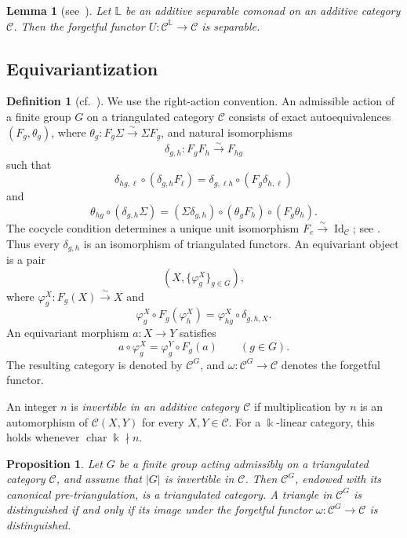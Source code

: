 \documentclass[a4paper,11pt,reqno]{amsart}
\newtheorem{proposition}[proposition]{Proposition}
\newtheorem{lemma}[lemma]{Lemma}
\theoremstyle{definition}
\newtheorem{definition}[definition]{Definition}
\theoremstyle{plain}
\numberwithin{equation}{section}
\newcommand{\C}{\mathcal C}
\newcommand{\kk}{\Bbbk}
\begin{document}
\begin{lemma}[{\normalfont see~\cite[Remark~5.19]{Balmer2011}}]
\label{lem:separable-comonad-forgetful}
Let \(\mathbb L\) be an additive separable comonad on an additive category
\(\C\).
Then the forgetful functor \(U:\C^{\mathbb L}\to\C\) is separable.
\end{lemma}

\subsection{Equivariantization}

\begin{definition}[{\normalfont cf.~\cite[Definitions~2.5 and~3.1]
{Sun2019}}]
We use the right-action convention.  An admissible action of a
finite group \(G\) on a triangulated category \(\C\) consists of exact
autoequivalences \((F_g,\theta_g)\), where
\(\theta_g:F_g\Sigma\xrightarrow{\sim}\Sigma F_g\), and natural isomorphisms
\[
 \delta_{g,h}:F_gF_h\xrightarrow{\sim}F_{hg}
\]
such that
\[
 \delta_{hg,\ell}\circ(\delta_{g,h}F_\ell)
 =\delta_{g,\ell h}\circ(F_g\delta_{h,\ell})
\]
and
\[
 \theta_{hg}\circ(\delta_{g,h}\Sigma)
 =(\Sigma\delta_{g,h})\circ(\theta_gF_h)\circ(F_g\theta_h).
\]
The cocycle condition determines a unique unit isomorphism
\(F_e\xrightarrow{\sim}\operatorname{Id}_{\C}\); see
\cite[Remark~2.7]{Sun2019}.  Thus every \(\delta_{g,h}\) is an isomorphism of triangulated functors.  An equivariant object is a
pair
\[
 (X,\{\varphi_g^X\}_{g\in G}),
\]
where \(\varphi_g^X:F_g(X)\xrightarrow{\sim}X\) and
\[
 \varphi_g^X\circ F_g(\varphi_h^X)
 =\varphi_{hg}^X\circ\delta_{g,h,X}.
\]
An equivariant morphism \(a:X\to Y\) satisfies
\[
 a\circ\varphi_g^X=\varphi_g^Y\circ F_g(a)
 \qquad(g\in G).
\]
The resulting category is denoted by \(\C^G\), and
\(\omega:\C^G\to\C\) denotes the forgetful functor.
\end{definition}

An integer \(n\) is \emph{invertible in an additive category \(\C\)} if
multiplication by \(n\) is an automorphism of \(\C(X,Y)\) for every
\(X,Y\in\C\).  For a \(\kk\)-linear category, this holds whenever
\(\operatorname{char}\kk\nmid n\).

\begin{proposition}
\label{prop:equivariant-triangulations}
Let $G$ be a finite group acting admissibly on a triangulated category
$\C$, and assume that \(|G|\) is invertible in \(\C\).  Then
\(\C^G\), endowed with its canonical pre-triangulation, is a triangulated
category.  A triangle in \(\C^G\) is distinguished if and only if its
image under the forgetful functor \(\omega:\C^G\to\C\) is distinguished.
\end{proposition}
\end{document}
